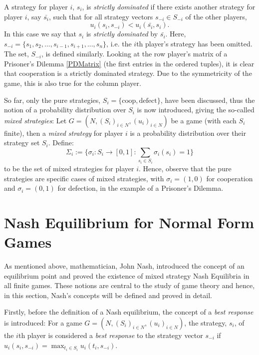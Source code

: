 A strategy for player $i$, $s_{i}$, is \textit{strictly dominated} if there
exists another strategy for player $i$, say $\bar{s_{i}}$, such that for all
strategy vectors $s_{-i} \in S_{-i}$ of the other players, 
$$
    u_{i}(s_{i}, s_{-i}) < u_{i}(\bar{s_{i}}, s_{i}).
$$
In this case we say that $s_{i}$ is \textit{strictly dominated} by
$\bar{s_{i}}$. Here, $s_{-i} = \{s_{1}, s_{2}, ..., s_{i-1}, s_{i+1}, ...,
s_{n}\}$, i.e. the $i$th player's strategy has been omitted. The set, $S_{-i}$,
is defined similarly. Looking at the row player's matrix of a Prisoner's Dilemma
\ref{PDMatrix} (the first entries in the ordered tuples), it is clear that
cooperation is a strictly dominated strategy. Due to the symmetricity of the
game, this is also true for the column player. \cite{maschler_solan_zamir_2013}



So far, only the pure strategies, $S_{i}=\{\text{coop}, \text{defect}\}$, have
been discussed, thus the notion of a probability distribution over $S_{i}$ is
now introduced, giving the so-called \textit{mixed strategies}:
Let $G=(N, (S_{i})_{i \in N}, (u_{i})_{i \in N})$ be a game (with each $S_{i}$
finite), then a \textit{mixed strategy} for player $i$ is a probability
distribution over their strategy set $S_{i}$. Define:
$$
\Sigma_{i} := \{\sigma_{i} : S_{i} \to [0, 1] : \sum_{s_{i} \in S_{i}}{\sigma_{i}(s_{i})} = 1\}   
$$
to be the set of mixed strategies for player $i$. Hence, observe that the pure
strategies are specific cases of mixed strategies, with $\sigma_{i} = (1, 0)$
for cooperation and $\sigma_{i} = (0, 1)$ for defection, in the example of a
Prisoner's Dilemma. \cite{maschler_solan_zamir_2013}

\section{Nash Equilibrium for Normal Form Games}
As mentioned above, mathematician, John Nash, introduced the concept of an
equilibrium point and proved the existence of mixed strategy Nash Equilibria in
all finite games. These notions are central to the study of game
theory \cite{maschler_solan_zamir_2013} and hence, in this section, Nash's
concepts will be defined and proved in detail.

Firstly, before the definition of a Nash equilibrium, the concept of a
\textit{best response} is introduced:
For a game $G=(N, (S_{i})_{i \in N}, (u_{i})_{i \in N})$, the strategy, $s_{i}$,
of the $i$th player is considered a \textit{best response} to the strategy
vector $s_{-i}$ if $u_{i}(s_{i}, s_{-i}) = \max_{t_{i} \in S_{i}}u_{i}(t_{i},
s_{-i})$. \cite{maschler_solan_zamir_2013}

